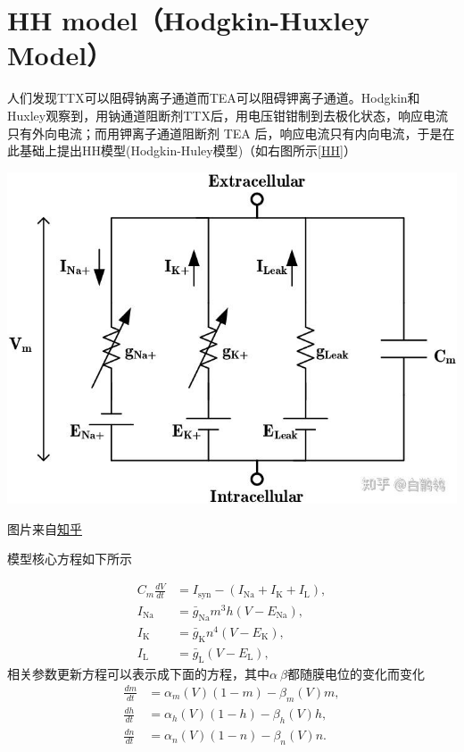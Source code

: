 \documentclass[nols, a4paper]{tufte-handout}
\begin{document}
\section{HH model（Hodgkin-Huxley Model）}
人们发现TTX可以阻碍钠离子通道而TEA可以阻碍钾离子通道。Hodgkin和Huxley观察到，用钠通道阻断剂TTX后，用电压钳钳制到去极化状态，响应电流只有外向电流；而用钾离子通道阻断剂 TEA 后，响应电流只有内向电流，于是在此基础上提出HH模型(Hodgkin-Huley模型)（如右图所示\ref{HH}）
\begin{marginfigure}
  \includegraphics[width=\linewidth]{image/HH.jpg} 
  \caption{图片来自\href{https://pica.zhimg.com/v2-7fb5b005d30ef4b685eda0643fea9270_1440w.jpg}{知乎}}
  \label{HH}
\end{marginfigure}

模型核心方程如下所示

\begin{align}
C_m \frac{dV}{dt} &= I_{\text{syn}} - \left( I_{\text{Na}} + I_{\text{K}} + I_{\text{L}} \right), \\
I_{\text{Na}} &= \bar{g}_{\text{Na}} m^3 h \left(V - E_{\text{Na}}\right), \\
I_{\text{K}}  &= \bar{g}_{\text{K}} n^4 \left(V - E_{\text{K}}\right), \\
I_{\text{L}}  &= \bar{g}_{\text{L}} \left(V - E_{\text{L}}\right),
\end{align}
相关参数更新方程可以表示成下面的方程，其中$\alpha \ \beta$都随膜电位的变化而变化
\begin{align}
\frac{dm}{dt} &= \alpha_m(V)(1-m) - \beta_m(V)m, \\
\frac{dh}{dt} &= \alpha_h(V)(1-h) - \beta_h(V)h, \\
\frac{dn}{dt} &= \alpha_n(V)(1-n) - \beta_n(V)n.
\end{align}
\end{document}
